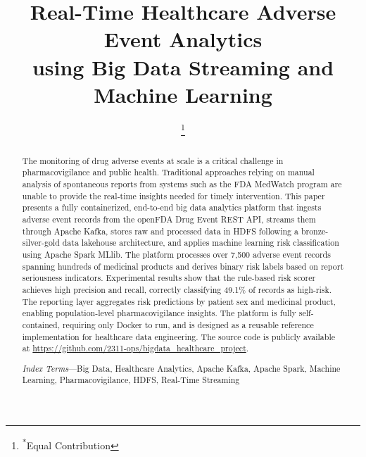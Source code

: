 \documentclass[conference]{IEEEtran}
\begin{document}
\title{Real-Time Healthcare Adverse Event Analytics\\
using Big Data Streaming and Machine Learning}

\author{
\thanks{\textsuperscript{*}Equal Contribution}
}

\maketitle

\begin{abstract}
The monitoring of drug adverse events at scale is a critical challenge in pharmacovigilance and public health. Traditional approaches relying on manual analysis of spontaneous reports from systems such as the FDA MedWatch program are unable to provide the real-time insights needed for timely intervention. This paper presents a fully containerized, end-to-end big data analytics platform that ingests adverse event records from the openFDA Drug Event REST API, streams them through Apache Kafka, stores raw and processed data in HDFS following a bronze-silver-gold data lakehouse architecture, and applies machine learning risk classification using Apache Spark MLlib. The platform processes over 7,500 adverse event records spanning hundreds of medicinal products and derives binary risk labels based on report seriousness indicators. Experimental results show that the rule-based risk scorer achieves high precision and recall, correctly classifying 49.1\% of records as high-risk. The reporting layer aggregates risk predictions by patient sex and medicinal product, enabling population-level pharmacovigilance insights. The platform is fully self-contained, requiring only Docker to run, and is designed as a reusable reference implementation for healthcare data engineering. The source code is publicly available at \url{https://github.com/2311-ops/bigdata_healthcare_project}.

\textit{Index Terms}---Big Data, Healthcare Analytics, Apache Kafka, Apache Spark, Machine Learning, Pharmacovigilance, HDFS, Real-Time Streaming
\end{abstract}

\end{document}
